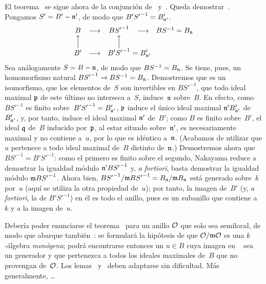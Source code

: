 El teorema~ se sigue ahora de la conjunción de~ y~. Queda demostrar~. Pongamos $S'=B'-\goth{n}'$, de modo que $B'{S'}^{-1}=B'_{\goth{n}'}$.
$$
\begin{array}{ccccc}
B&\longrightarrow&B{S'}^{-1}&\longrightarrow&BS^{-1}=B_\goth{n}\\ \Big\uparrow&&\Big\uparrow&&\\
B'&\longrightarrow&B'{S'}^{-1}
\rlap{\hbox{$\displaystyle\ =B'_{\goth{n}'}$}}&&
\end{array}
$$
Sea análogamente $S=B-\goth{n}$, de modo que $BS^{-1}=B_\goth{n}$. Se tiene, pues, un homomorfismo natural $B{S'}^{-1}\to BS^{-1}=B_\goth{n}$. Demostremos que es un isomorfismo, \ie que los elementos de~$S$ son invertibles en $B{S'}^{-1}$, \ie que todo ideal maximal $\goth{p}$ de este último no interseca a~$S$, \ie induce~$\goth{n}$ sobre~$B$. En efecto, como $B{S'}^{-1}$ es finito sobre~$B'{S'}^{-1}=B'_{\goth{n}'}$, $\goth{p}$ induce el único ideal maximal $\goth{n}'B'_{\goth{n}'}$ de~$B'_{\goth{n}'}$,%
y, por tanto, induce el ideal maximal $\goth{n}'$ de~$B'$; como $B$ es finito sobre~$B'$, el ideal $\goth{q}$ de~$B$ inducido por~$\goth{p}$, al estar situado sobre~$\goth{n}'$, es necesariamente maximal y no contiene a~$u$, por lo que es idéntico a~$\goth{n}$. (Acabamos de utilizar que $u$ pertenece a todo ideal maximal de~$B$ distinto de~$\goth{n}$.) Demostremos ahora que $B{S'}^{-1}=B'{S'}^{-1}$: como el primero es finito sobre el segundo, Nakayama reduce a demostrar la igualdad módulo $\goth{n}'B{S'}^{-1}$ y, \emph{a fortiori}, basta demostrar la igualdad módulo $\goth{m}B{S'}^{-1}$. Ahora bien,
$B{S'}^{-1}/\goth{m}B{S'}^{-1}=B_\goth{n}/\goth{m}B_\goth{n}$
está generado sobre~$k$ por~$u$ (aquí se utiliza la otra propiedad de~$u$); por tanto, la imagen de~$B'$ (y, \emph{a fortiori}, la de $B'{S'}^{-1}$) en él es todo el anillo, pues es un subanillo que contiene a~$k$ y a la imagen de~$u$.

\begin{remarquestar}
Debería poder enunciarse el teorema~ para un anillo $\cal{O}$ que solo sea semilocal, de modo que abarque también~: se formulará la hipótesis de que $\cal{O}/\goth{m}\cal{O}$ es una $k$-álgebra \emph{monógena}; podrá encontrarse entonces un $u\in B$ cuya imagen en \ %
sea un generador y que pertenezca a todos los ideales maximales de~$B$ que no provengan de~$\cal{O}$. Los lemas~ y~ deben adaptarse sin dificultad. Más generalmente, \ldots
\end{remarquestar}
